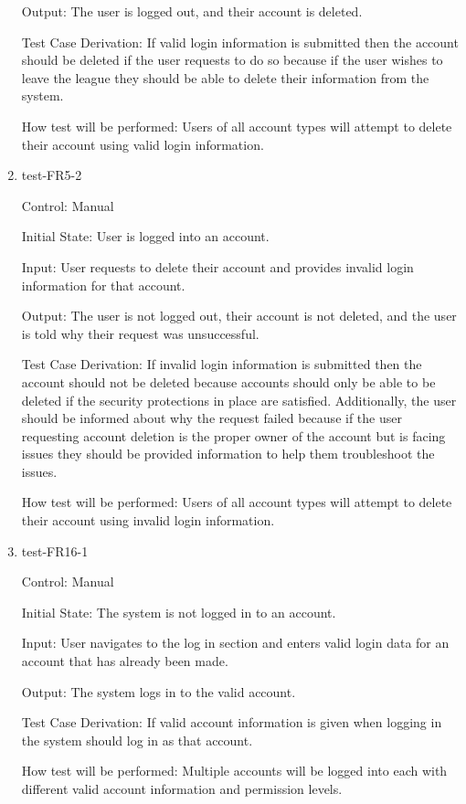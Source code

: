 \documentclass[12pt, titlepage]{article}
\begin{document}
\begin{enumerate}
  Output: The user is logged out, and their account is deleted.

  Test Case Derivation: If valid login information is submitted then the
  account should be deleted if the user requests to do so because if the user
  wishes to leave the league they should be able to delete their information
  from the system.

  How test will be performed: Users of all account types will attempt to delete
  their account using valid login information.

  \item{test-FR5-2\\}

  Control: Manual

  Initial State: User is logged into an account.

  Input: User requests to delete their account and provides invalid login
  information for that account.

  Output: The user is not logged out, their account is not deleted, and
  the user is told why their request was unsuccessful.

  Test Case Derivation: If invalid login information is submitted then the
  account should not be deleted because accounts should only be able to be
  deleted if the security protections in place are satisfied. Additionally,
  the user should be informed about why the request failed because if the
  user requesting account deletion is the proper owner of the account but is
  facing issues they should be provided information to help them troubleshoot
  the issues.

  How test will be performed: Users of all account types will attempt to delete
  their account using invalid login information.

  \item{test-FR16-1\\}

  Control: Manual

  Initial State: The system is not logged in to an account.

  Input: User navigates to the log in section and enters valid login data for
  an account that has already been made.

  Output: The system logs in to the valid account.

  Test Case Derivation: If valid account information is given when logging in
  the system should log in as that account.

  How test will be performed: Multiple accounts will be logged into each with
  different valid account information and permission levels.


\end{enumerate}
\end{document}
